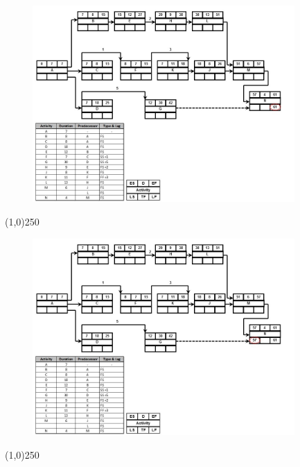 \begin{frame}
\begin{figure}
	\centering
		\includegraphics[width = 10.0cm]{oldnotes/Slide220.jpg}
\end{figure}
\end{frame}
\begin{center}\line(1,0){250}\end{center}




\begin{frame}
\begin{figure}
	\centering
		\includegraphics[width = 10.0cm]{oldnotes/Slide221.jpg}
\end{figure}
\end{frame}
\begin{center}\line(1,0){250}\end{center}




